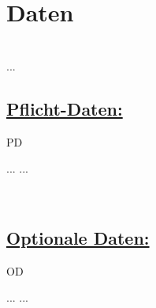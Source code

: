 %
%



\chapter{Daten}
\label{DT}~\\

...
\\

\section*{\underline{Pflicht-Daten:}}

\begin{ids}{\gls{PD}}

	\id[ 1] ...
	\id[10] ...

\end{ids}

~\\

\section*{\underline{Optionale Daten:}}

\begin{ids}{\gls{OD}}

	\id[ 11] ...
	\id[100] ...

\end{ids}









